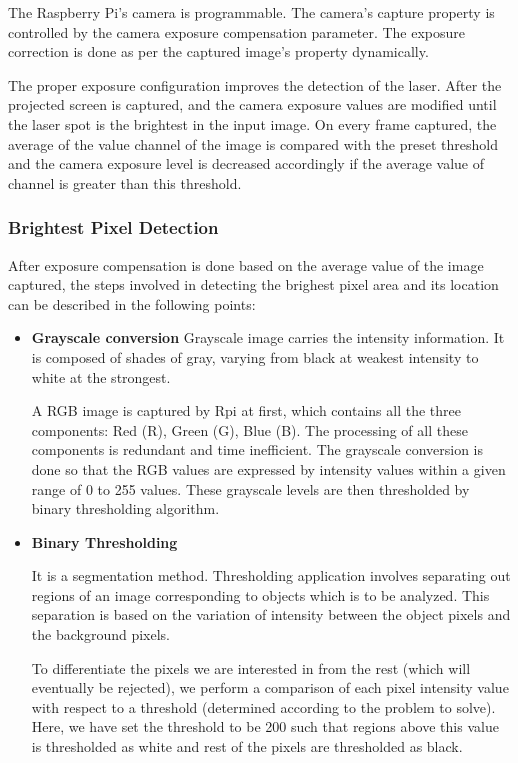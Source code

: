 \documentclass[12pt, a4paper]{article}
\begin{document}
{	The Raspberry Pi's camera is programmable. The camera's capture property is controlled by the camera exposure compensation parameter. The exposure correction is done as per the captured image's property dynamically. 
	
	The proper exposure configuration improves the detection of the laser. After the projected screen is captured, and the camera exposure values are modified until the laser spot is the brightest in the input image. On every frame captured, the average of the value channel of the image is compared with the preset threshold and the camera exposure level is decreased accordingly if the average value of channel is greater than this threshold.
	
	
\subsubsection{Brightest Pixel Detection}
After exposure compensation is done based on the average value of the image captured, the steps involved in detecting the brighest pixel area and its location can be described in the following points:
\begin{itemize}
\item {\textbf{Grayscale conversion}}
Grayscale image carries the intensity information. It is composed of shades of gray, varying from black at weakest intensity to white at the strongest. 

A RGB image is captured by Rpi at first, which contains all the three components: Red (R), Green (G), Blue (B). The processing of all these components is redundant and time inefficient. The grayscale conversion is done so that the RGB values are expressed by intensity values within a given range of 0 to 255 values. These grayscale levels are then thresholded by binary thresholding algorithm. 

\item {\textbf{Binary Thresholding}}

It is a segmentation method. Thresholding application involves separating out regions of an image corresponding to objects which is to be analyzed. This separation is based on the variation of intensity between the object pixels and the background pixels.

To differentiate the pixels we are interested in from the rest (which will eventually be rejected), we perform a comparison of each pixel intensity value with respect to a threshold (determined according to the problem to solve). Here, we have set the threshold to be 200 such that regions above this value is thresholded as white and rest of the pixels are thresholded as black.



\end{itemize}}
\end{document}
